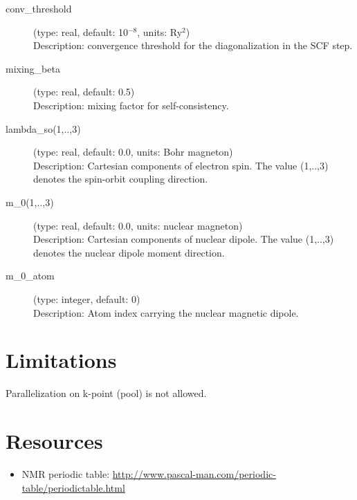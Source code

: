 \documentclass[a4paper,11pt,twoside]{article}
\begin{document}
\begin{description}
\item[conv\_threshold] (type: real, default: 10$^{-8}$, units: Ry$^2$)\\
Description: convergence threshold for the diagonalization in the SCF step.

\item[mixing\_beta] (type: real, default: 0.5)\\
Description: mixing factor for self-consistency.

\item[lambda\_so(1,..,3)] (type: real, default: 0.0, units: Bohr magneton)\\
Description: Cartesian components of electron spin. The value (1,..,3) denotes the spin-orbit coupling direction.

\item[m\_0(1,..,3)] (type: real, default: 0.0, units: nuclear magneton)\\
Description: Cartesian components of nuclear dipole. The value (1,..,3) denotes the nuclear dipole moment direction.

\item[m\_0\_atom] (type: integer, default: 0)\\
Description: Atom index carrying the nuclear magnetic dipole.


\end{description}


\section{Limitations}
Parallelization on k-point (pool) is not allowed. 


\section{Resources}
\begin{itemize}

\item NMR periodic table: \url{http://www.pascal-man.com/periodic-table/periodictable.html}

\end{itemize}


\begin{thebibliography}{99}
\bibitem{}
  

\end{thebibliography}

\end{document}
